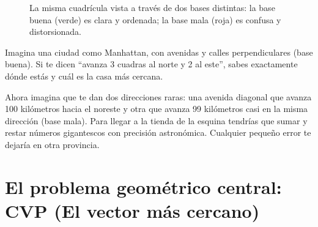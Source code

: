 \begin{figure}[htbp]
\centering
{}
\caption{La misma cuadrícula vista a través de dos bases distintas: la base buena (verde) es clara y ordenada; la base mala (roja) es confusa y distorsionada.}
\label{fig:base_buena_mala}
\end{figure}

\begin{metafora}
Imagina una ciudad como Manhattan, con avenidas y calles perpendiculares (base buena). Si te dicen ``avanza 3 cuadras al norte y 2 al este'', sabes exactamente dónde estás y cuál es la casa más cercana. 

Ahora imagina que te dan dos direcciones raras: una avenida diagonal que avanza 100 kilómetros hacia el noreste y otra que avanza 99 kilómetros casi en la misma dirección (base mala). Para llegar a la tienda de la esquina tendrías que sumar y restar números gigantescos con precisión astronómica. Cualquier pequeño error te dejaría en otra provincia.
\end{metafora}

\section{El problema geométrico central: CVP (El vector más cercano)}

